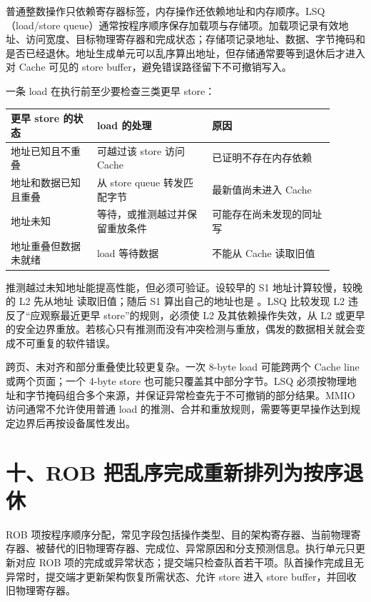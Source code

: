普通整数操作只依赖寄存器标签，内存操作还依赖地址和内存顺序。LSQ（load/store queue）通常按程序顺序保存加载项与存储项。加载项记录有效地址、访问宽度、目标物理寄存器和完成状态；存储项记录地址、数据、字节掩码和是否已经退休。地址生成单元可以乱序算出地址，但存储通常要等到退休后才进入对 Cache 可见的 store buffer，避免错误路径留下不可撤销写入。

一条 load 在执行前至少要检查三类更早 store：

\begin{longtable}{L{0.24\linewidth}L{0.32\linewidth}L{0.34\linewidth}}
\toprule
更早 store 的状态 & load 的处理 & 原因 \\
\midrule
地址已知且不重叠 & 可越过该 store 访问 Cache & 已证明不存在内存依赖 \\\tablerowrule
地址和数据已知且重叠 & 从 store queue 转发匹配字节 & 最新值尚未进入 Cache \\\tablerowrule
地址未知 & 等待，或推测越过并保留重放条件 & 可能存在尚未发现的同址写 \\\tablerowrule
地址重叠但数据未就绪 & load 等待数据 & 不能从 Cache 读取旧值 \\
\bottomrule
\end{longtable}

推测越过未知地址能提高性能，但必须可验证。设较早的 S1 地址计算较慢，较晚的 L2 先从地址  读取旧值；随后 S1 算出自己的地址也是 。LSQ 比较发现 L2 违反了“应观察最近更早 store”的规则，必须使 L2 及其依赖操作失效，从 L2 或更早的安全边界重放。若核心只有推测而没有冲突检测与重放，偶发的数据相关就会变成不可重复的软件错误。

跨页、未对齐和部分重叠使比较更复杂。一次 8-byte load 可能跨两个 Cache line 或两个页面；一个 4-byte store 也可能只覆盖其中部分字节。LSQ 必须按物理地址和字节掩码组合多个来源，并保证异常检查先于不可撤销的部分结果。MMIO 访问通常不允许使用普通 load 的推测、合并和重放规则，需要等更早操作达到规定边界后再按设备属性发出。

\section{十、ROB 把乱序完成重新排列为按序退休}

ROB 项按程序顺序分配，常见字段包括操作类型、目的架构寄存器、当前物理寄存器、被替代的旧物理寄存器、完成位、异常原因和分支预测信息。执行单元只更新对应 ROB 项的完成或异常状态；提交端只检查队首若干项。队首操作完成且无异常时，提交端才更新架构恢复所需状态、允许 store 进入 store buffer，并回收旧物理寄存器。

